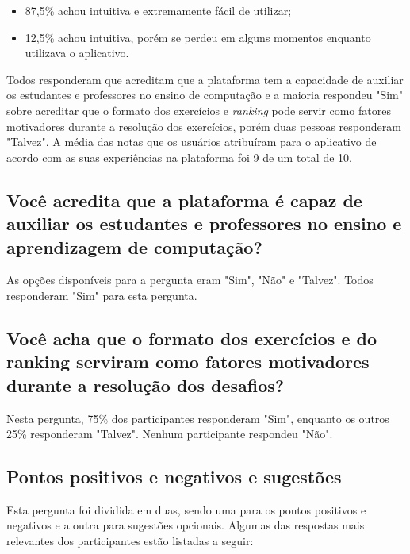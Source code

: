 \begin{itemize}
    \item 87,5\% achou intuitiva e extremamente fácil de utilizar;
    \item 12,5\% achou intuitiva, porém se perdeu em alguns momentos enquanto utilizava o aplicativo.
\end{itemize}

Todos responderam que acreditam que a plataforma tem a capacidade de auxiliar os estudantes e professores no ensino de computação e a maioria respondeu "Sim" sobre acreditar que o formato dos exercícios e \textit{ranking} pode servir como fatores motivadores durante a resolução dos exercícios, porém duas pessoas responderam "Talvez". A média das notas que os usuários atribuíram para o aplicativo de acordo com as suas experiências na plataforma foi 9 de um total de 10.

\subsection{Você acredita que a plataforma é capaz de auxiliar os estudantes e professores no ensino e aprendizagem de computação?}

As opções disponíveis para a pergunta eram "Sim", "Não" e "Talvez". Todos responderam "Sim" para esta pergunta.

\subsection{Você acha que o formato dos exercícios e do ranking serviram como fatores motivadores durante a resolução dos desafios?}

Nesta pergunta, 75\% dos participantes responderam "Sim", enquanto os outros 25\% responderam "Talvez". Nenhum participante respondeu "Não".

\subsection{Pontos positivos e negativos e sugestões}

Esta pergunta foi dividida em duas, sendo uma para os pontos positivos e negativos e a outra para sugestões opcionais. Algumas das respostas mais relevantes dos participantes estão listadas a seguir:

